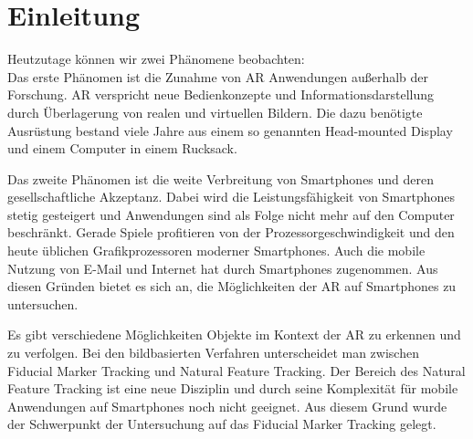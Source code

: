 \chapter{Einleitung} %
\label{cha:einleitung}

Heutzutage können wir zwei Phänomene beobachten:\\Das erste Phänomen ist die Zunahme von \gls{AR} Anwendungen außerhalb
 der Forschung. \gls{AR} verspricht neue Bedienkonzepte und Informationsdarstellung durch Überlagerung von realen und
 virtuellen Bil\-dern. Die dazu benötigte Ausrüstung bestand viele Jahre aus einem so genannten Head-mounted Display
 und einem Computer in einem Rucksack.

Das zweite Phänomen ist die weite Verbreitung von Smartphones und deren ge\-sell\-schaft\-liche Akzeptanz. Dabei wird die Leistungsfähigkeit von Smartphones stetig ge\-stei\-gert und Anwendungen sind als Folge nicht mehr auf den Computer beschränkt. Gerade Spiele profitieren von der Prozessor\-ge\-schwin\-dig\-keit und den heute üblichen Grafikprozessoren moderner Smartphones. Auch die mobile Nutzung von E-Mail und Internet hat durch Smartphones zugenommen. Aus diesen Gründen bietet es sich an, die Mög\-lich\-kei\-ten der \gls{AR} auf Smartphones zu untersuchen.

Es gibt verschiedene Möglichkeiten Objekte im Kontext der \gls{AR} zu erkennen und zu verfolgen. Bei den bildbasierten Verfahren unterscheidet man zwischen Fiducial Marker Tracking und Natural Feature Tracking. Der Bereich des Natural Feature Tracking ist eine neue Disziplin und durch seine Komplexität für mobile Anwendungen auf Smartphones noch nicht geeignet. Aus diesem Grund wurde der Schwerpunkt der Untersuchung auf das Fiducial Marker Tracking gelegt.





